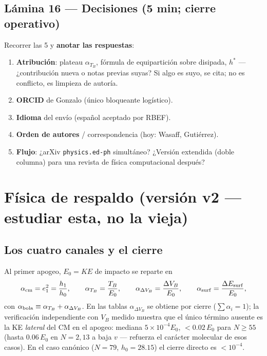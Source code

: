 \documentclass[11pt]{article}
\newcommand{\clave}[1]{\textcolor{red!60!black}{\textbf{#1}}}
\begin{document}
\subsection*{Lámina 16 --- Decisiones (5 min; cierre operativo)}
Recorrer las 5 y \clave{anotar las respuestas}:
\begin{enumerate}[leftmargin=1.6em]
    \item \textbf{Atribución}: plateau $\alpha_{T_B}$, fórmula de
    equipartición sobre disipada, $h^*$ --- ¿contribución nueva o notas
    previas suyas? Si algo es suyo, se cita; no es conflicto, es
    limpieza de autoría.
    \item \textbf{ORCID} de Gonzalo (único bloqueante logístico).
    \item \textbf{Idioma} del envío (español aceptado por RBEF).
    \item \textbf{Orden de autores} / correspondencia (hoy: Wasaff,
    Gutiérrez).
    \item \textbf{Flujo}: ¿arXiv \texttt{physics.ed-ph} simultáneo?
    ¿Versión extendida (doble columna) para una revista de física
    computacional después?
\end{enumerate}

\section{Física de respaldo (versión v2 --- estudiar esta, no la vieja)}

\subsection{Los cuatro canales y el cierre}
Al primer apogeo, $E_0=KE$ de impacto se reparte en
\[ \alpha_{\rm cm}=e_1^2=\frac{h_1}{h_0},\qquad
   \alpha_{T_B}=\frac{T_B}{E_0},\qquad
   \alpha_{\Delta V_B}=\frac{\Delta V_B}{E_0},\qquad
   \alpha_{\rm surf}=\frac{\Delta E_{\rm surf}}{E_0}, \]
con $\alpha_{\rm bola}\equiv\alpha_{T_B}+\alpha_{\Delta V_B}$. En las
tablas $\alpha_{\Delta V_B}$ se obtiene por cierre ($\sum\alpha_i=1$);
la verificación independiente con $V_B$ medido muestra que el único
término ausente es la KE \emph{lateral} del CM en el apogeo: mediana
$5\times10^{-4}E_0$, $<0.02\,E_0$ para $N\ge55$ (hasta $0.06\,E_0$ en
$N=2,13$ a baja $v$ --- refuerza el carácter molecular de esos casos).
En el caso canónico ($N=79$, $h_0=28.15$) el cierre directo es
$<10^{-4}$.
\end{document}
